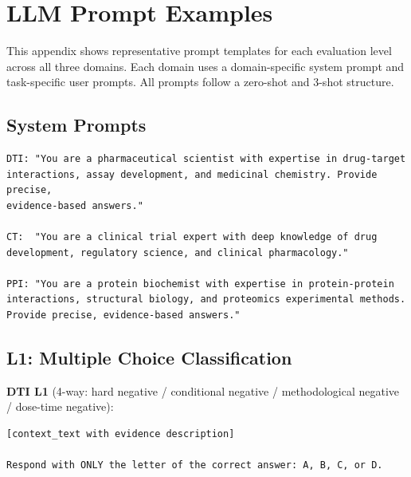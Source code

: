 \section{LLM Prompt Examples}
\label{app:prompts}

This appendix shows representative prompt templates for each evaluation level across all three domains. Each domain uses a domain-specific system prompt and task-specific user prompts. All prompts follow a zero-shot and 3-shot structure.

\subsection{System Prompts}

\begin{small}
\begin{verbatim}
DTI: "You are a pharmaceutical scientist with expertise in drug-target
interactions, assay development, and medicinal chemistry. Provide precise,
evidence-based answers."

CT:  "You are a clinical trial expert with deep knowledge of drug
development, regulatory science, and clinical pharmacology."

PPI: "You are a protein biochemist with expertise in protein-protein
interactions, structural biology, and proteomics experimental methods.
Provide precise, evidence-based answers."
\end{verbatim}
\end{small}

\subsection{L1: Multiple Choice Classification}

\textbf{DTI L1} (4-way: hard negative / conditional negative / methodological negative / dose-time negative):
\begin{small}
\begin{verbatim}
[context_text with evidence description]

Respond with ONLY the letter of the correct answer: A, B, C, or D.
\end{verbatim}
\end{small}

